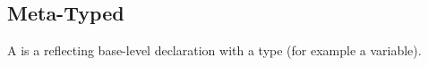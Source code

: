 \subsection{Meta-Typed}
\label{concept-Meta-Typed}

A  is a  reflecting base-level declaration with a type
(for example a variable).




